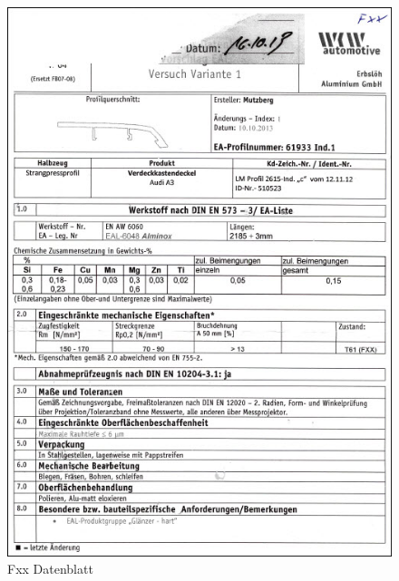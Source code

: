 \documentclass[12pt,a4paper,parskip]{scrartcl}
\begin{document}
\begin{figure}[hbtp]
\centering
\includegraphics[width=1\textwidth]{FxxDatenblatt.jpg}
\caption{Fxx Datenblatt}
\end{figure}
\end{document}
